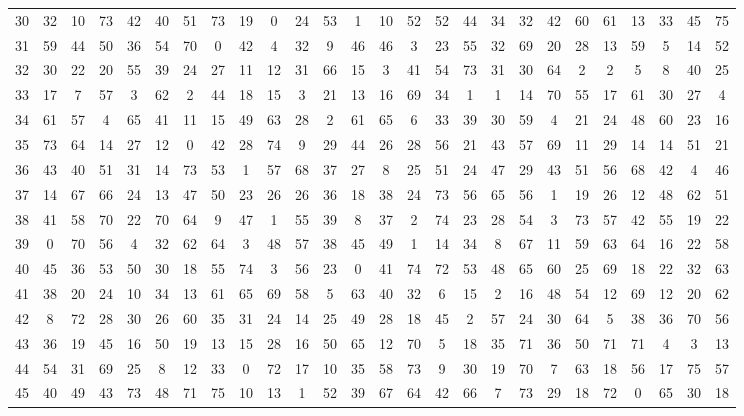 \begin{table}
\begin{tabular}{c c c c c c c c c c c c c c c c c c c c c c c c c c }
30 & 32 & 10 & 73 & 42 & 40 & 51 & 73 & 19 & 0 & 24 & 53 & 1 & 10 & 52 & 52 & 44 & 34 & 32 & 42 & 60 & 61 & 13 & 33 & 45 & 75 \\
31 & 59 & 44 & 50 & 36 & 54 & 70 & 0 & 42 & 4 & 32 & 9 & 46 & 46 & 3 & 23 & 55 & 32 & 69 & 20 & 28 & 13 & 59 & 5 & 14 & 52 \\
32 & 30 & 22 & 20 & 55 & 39 & 24 & 27 & 11 & 12 & 31 & 66 & 15 & 3 & 41 & 54 & 73 & 31 & 30 & 64 & 2 & 2 & 5 & 8 & 40 & 25 \\
33 & 17 & 7 & 57 & 3 & 62 & 2 & 44 & 18 & 15 & 3 & 21 & 13 & 16 & 69 & 34 & 1 & 1 & 14 & 70 & 55 & 17 & 61 & 30 & 27 & 4 \\
34 & 61 & 57 & 4 & 65 & 41 & 11 & 15 & 49 & 63 & 28 & 2 & 61 & 65 & 6 & 33 & 39 & 30 & 59 & 4 & 21 & 24 & 48 & 60 & 23 & 16 \\
35 & 73 & 64 & 14 & 27 & 12 & 0 & 42 & 28 & 74 & 9 & 29 & 44 & 26 & 28 & 56 & 21 & 43 & 57 & 69 & 11 & 29 & 14 & 14 & 51 & 21 \\
36 & 43 & 40 & 51 & 31 & 14 & 73 & 53 & 1 & 57 & 68 & 37 & 27 & 8 & 25 & 51 & 24 & 47 & 29 & 43 & 51 & 56 & 68 & 42 & 4 & 46 \\
37 & 14 & 67 & 66 & 24 & 13 & 47 & 50 & 23 & 26 & 26 & 36 & 18 & 38 & 24 & 73 & 56 & 65 & 56 & 1 & 19 & 26 & 12 & 48 & 62 & 51 \\
38 & 41 & 58 & 70 & 22 & 70 & 64 & 9 & 47 & 1 & 55 & 39 & 8 & 37 & 2 & 74 & 23 & 28 & 54 & 3 & 73 & 57 & 42 & 55 & 19 & 22 \\
39 & 0 & 70 & 56 & 4 & 32 & 62 & 64 & 3 & 48 & 57 & 38 & 45 & 49 & 1 & 14 & 34 & 8 & 67 & 11 & 59 & 63 & 64 & 16 & 22 & 58 \\
40 & 45 & 36 & 53 & 50 & 30 & 18 & 55 & 74 & 3 & 56 & 23 & 0 & 41 & 74 & 72 & 53 & 48 & 65 & 60 & 25 & 69 & 18 & 22 & 32 & 63 \\
41 & 38 & 20 & 24 & 10 & 34 & 13 & 61 & 65 & 69 & 58 & 5 & 63 & 40 & 32 & 6 & 15 & 2 & 16 & 48 & 54 & 12 & 69 & 12 & 20 & 62 \\
42 & 8 & 72 & 28 & 30 & 26 & 60 & 35 & 31 & 24 & 14 & 25 & 49 & 28 & 18 & 45 & 2 & 57 & 24 & 30 & 64 & 5 & 38 & 36 & 70 & 56 \\
43 & 36 & 19 & 45 & 16 & 50 & 19 & 13 & 15 & 28 & 16 & 50 & 65 & 12 & 70 & 5 & 18 & 35 & 71 & 36 & 50 & 71 & 71 & 4 & 3 & 13 \\
44 & 54 & 31 & 69 & 25 & 8 & 12 & 33 & 0 & 72 & 17 & 10 & 35 & 58 & 73 & 9 & 30 & 19 & 70 & 7 & 63 & 18 & 56 & 17 & 75 & 57 \\
45 & 40 & 49 & 43 & 73 & 48 & 71 & 75 & 10 & 13 & 1 & 52 & 39 & 67 & 64 & 42 & 66 & 7 & 73 & 29 & 18 & 72 & 0 & 65 & 30 & 18 \\

\end{tabular}
\end{table}
